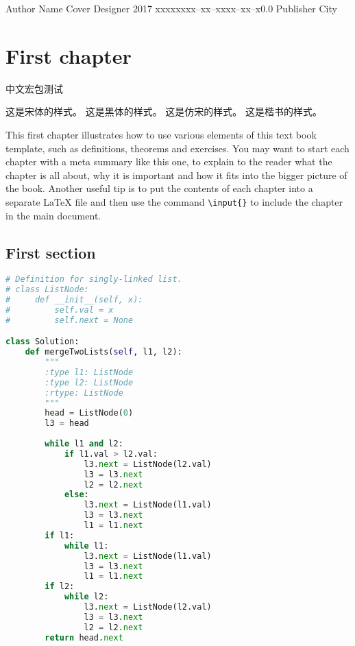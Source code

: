 \documentclass{tstextbook}
\begin{document}
       {Author Name}
       {Cover Designer}
       {2017}
       {xxxxx}{xxx--xx--xxxx--xx--x}{0.0}
       {Publisher}
       {City}


\chapter{First chapter}

\begin{summary}
  中文宏包测试               \par 
{\songti   这是宋体的样式。} 
{\heiti    这是黑体的样式。} 
{\fangsong 这是仿宋的样式。} 
{\kaishu   这是楷书的样式。} \par

This first chapter illustrates how to use various elements of this
  text book template, such as definitions, theorems and exercises. You
  may want to start each chapter with a meta summary like this one, to
  explain to the reader what the chapter is all about, why it is
  important and how it fits into the bigger picture of the
  book. Another useful tip is to put the contents of each chapter into
  a separate \LaTeX{} file and then use the command
  \texttt{\textbackslash{}input\{\}} to include the chapter in the
  main document.
\end{summary}

\section{First section}

\begin{lstlisting}[title=代码块1,language=Python]
# Definition for singly-linked list.
# class ListNode:
#     def __init__(self, x):
#         self.val = x
#         self.next = None

class Solution:
    def mergeTwoLists(self, l1, l2):
        """
        :type l1: ListNode
        :type l2: ListNode
        :rtype: ListNode
        """
        head = ListNode(0)
        l3 = head
        
        while l1 and l2:
            if l1.val > l2.val:
                l3.next = ListNode(l2.val)
                l3 = l3.next
                l2 = l2.next
            else:
                l3.next = ListNode(l1.val)
                l3 = l3.next
                l1 = l1.next
        if l1:
            while l1:
                l3.next = ListNode(l1.val)
                l3 = l3.next
                l1 = l1.next
        if l2:
            while l2:
                l3.next = ListNode(l2.val)
                l3 = l3.next
                l2 = l2.next
        return head.next
\end{lstlisting}
\end{document}
